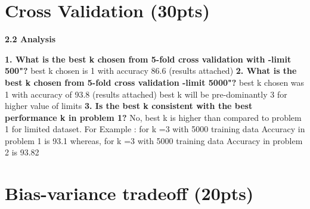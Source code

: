 \documentclass[11pt]{article}
\begin{document}
\section{Cross Validation (30pts)}
\textbf{2.2 Analysis}

\textbf{1. What is the best k chosen from 5-fold cross validation with \--limit 500"?
}\newline best k chosen is 1 with accuracy 86.6 (results attached)
\newline\textbf{2. What is the best k chosen from 5-fold cross validation \--limit 5000"?}
\newline best k chosen was 1 with accuracy of 93.8 (results attached)
\newline best k will be pre-dominantly 3 for higher value of limits
\newline\textbf{3. Is the best k consistent with the best performance k in problem 1?}
\newline No, best k is higher than compared to problem 1 for limited dataset.
\newline For Example : 
for k =3 with 5000 training data Accuracy in problem 1 is 93.1\newline
whereas,
\newline for k =3 with 5000 training data Accuracy in problem 2 is 93.82\newline

\section{Bias-variance tradeoff (20pts)}
\end{document}
